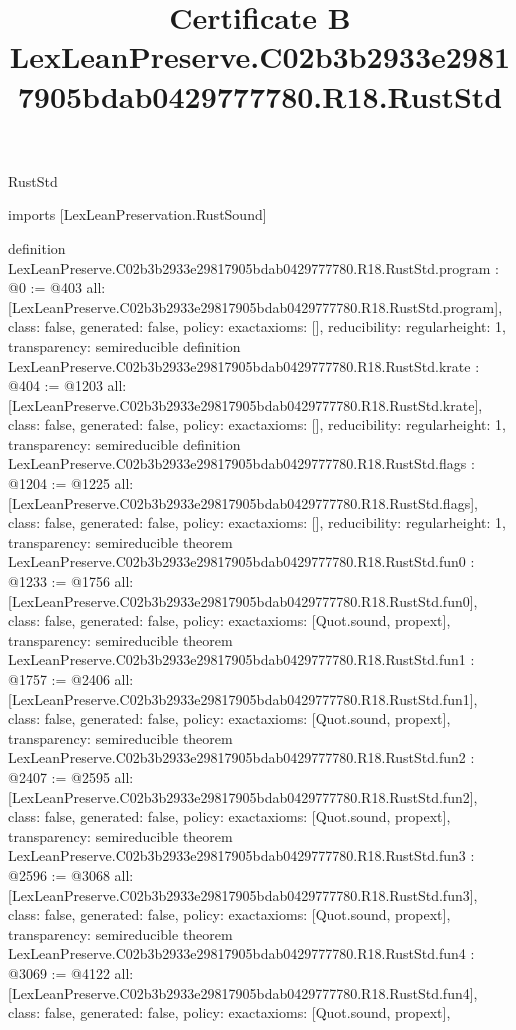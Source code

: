 \begin{lexlean}{RustStd}
\title{Certificate B LexLeanPreserve.C02b3b2933e29817905bdab0429777780.R18.RustStd}
\begin{coremodule}
imports [LexLeanPreservation.RustSound]

definition LexLeanPreserve.C02b3b2933e29817905bdab0429777780.R18.RustStd.program : @0 := @403 {
  all: [LexLeanPreserve.C02b3b2933e29817905bdab0429777780.R18.RustStd.program],
  class: false,
  generated: false,
  policy: exact{axioms: []},
  reducibility: regular{height: 1},
  transparency: semireducible
}
definition LexLeanPreserve.C02b3b2933e29817905bdab0429777780.R18.RustStd.krate : @404 := @1203 {
  all: [LexLeanPreserve.C02b3b2933e29817905bdab0429777780.R18.RustStd.krate],
  class: false,
  generated: false,
  policy: exact{axioms: []},
  reducibility: regular{height: 1},
  transparency: semireducible
}
definition LexLeanPreserve.C02b3b2933e29817905bdab0429777780.R18.RustStd.flags : @1204 := @1225 {
  all: [LexLeanPreserve.C02b3b2933e29817905bdab0429777780.R18.RustStd.flags],
  class: false,
  generated: false,
  policy: exact{axioms: []},
  reducibility: regular{height: 1},
  transparency: semireducible
}
theorem LexLeanPreserve.C02b3b2933e29817905bdab0429777780.R18.RustStd.fun0 : @1233 := @1756 {
  all: [LexLeanPreserve.C02b3b2933e29817905bdab0429777780.R18.RustStd.fun0],
  class: false,
  generated: false,
  policy: exact{axioms: [Quot.sound, propext]},
  transparency: semireducible
}
theorem LexLeanPreserve.C02b3b2933e29817905bdab0429777780.R18.RustStd.fun1 : @1757 := @2406 {
  all: [LexLeanPreserve.C02b3b2933e29817905bdab0429777780.R18.RustStd.fun1],
  class: false,
  generated: false,
  policy: exact{axioms: [Quot.sound, propext]},
  transparency: semireducible
}
theorem LexLeanPreserve.C02b3b2933e29817905bdab0429777780.R18.RustStd.fun2 : @2407 := @2595 {
  all: [LexLeanPreserve.C02b3b2933e29817905bdab0429777780.R18.RustStd.fun2],
  class: false,
  generated: false,
  policy: exact{axioms: [Quot.sound, propext]},
  transparency: semireducible
}
theorem LexLeanPreserve.C02b3b2933e29817905bdab0429777780.R18.RustStd.fun3 : @2596 := @3068 {
  all: [LexLeanPreserve.C02b3b2933e29817905bdab0429777780.R18.RustStd.fun3],
  class: false,
  generated: false,
  policy: exact{axioms: [Quot.sound, propext]},
  transparency: semireducible
}
theorem LexLeanPreserve.C02b3b2933e29817905bdab0429777780.R18.RustStd.fun4 : @3069 := @4122 {
  all: [LexLeanPreserve.C02b3b2933e29817905bdab0429777780.R18.RustStd.fun4],
  class: false,
  generated: false,
  policy: exact{axioms: [Quot.sound, propext]},
}
\end{coremodule}
\end{lexlean}
